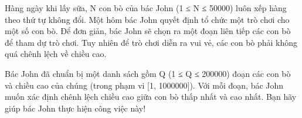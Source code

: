 Hàng ngày khi lấy sữa, N con bò của bác John (1 ≤ N ≤ 50000) luôn xếp hàng theo thứ tự không đổi. Một hôm bác John quyết định tổ chức một trò chơi cho một số con bò. Để đơn giản, bác John sẽ   chọn ra một đoạn liên tiếp các con bò để tham dự trò chơi. Tuy nhiên để trò chơi diễn ra vui vẻ, các con bò phải không quá chênh lệch về chiều cao.  

   Bác John đã chuẩn bị một danh sách gồm Q (1 ≤ Q ≤ 200000) đoạn các con bò và chiều cao của chúng (trong phạm vi [1, 1000000]). Với mỗi đoạn, bác John muốn xác định chênh lệch chiều cao giữa   con bò thấp nhất và cao nhất. Bạn hãy giúp bác John thực hiện công việc này!